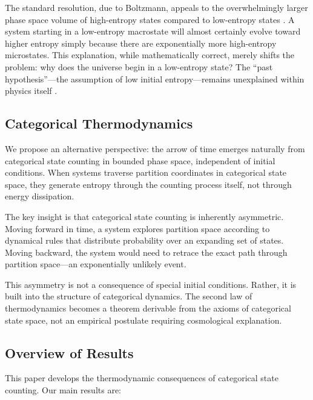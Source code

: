 \documentclass[twocolumn,10pt]{article}
\begin{document}
The standard resolution, due to Boltzmann, appeals to the overwhelmingly larger phase space volume of high-entropy states compared to low-entropy states \cite{boltzmann1896}. A system starting in a low-entropy macrostate will almost certainly evolve toward higher entropy simply because there are exponentially more high-entropy microstates. This explanation, while mathematically correct, merely shifts the problem: why does the universe begin in a low-entropy state? The ``past hypothesis''---the assumption of low initial entropy---remains unexplained within physics itself \cite{albert2000,carroll2010}.

\subsection{Categorical Thermodynamics}

We propose an alternative perspective: the arrow of time emerges naturally from categorical state counting in bounded phase space, independent of initial conditions. When systems traverse partition coordinates in categorical state space, they generate entropy through the counting process itself, not through energy dissipation.

The key insight is that categorical state counting is inherently asymmetric. Moving forward in time, a system explores partition space according to dynamical rules that distribute probability over an expanding set of states. Moving backward, the system would need to retrace the exact path through partition space---an exponentially unlikely event.

This asymmetry is not a consequence of special initial conditions. Rather, it is built into the structure of categorical dynamics. The second law of thermodynamics becomes a theorem derivable from the axioms of categorical state space, not an empirical postulate requiring cosmological explanation.

\subsection{Overview of Results}

This paper develops the thermodynamic consequences of categorical state counting. Our main results are:
\end{document}
